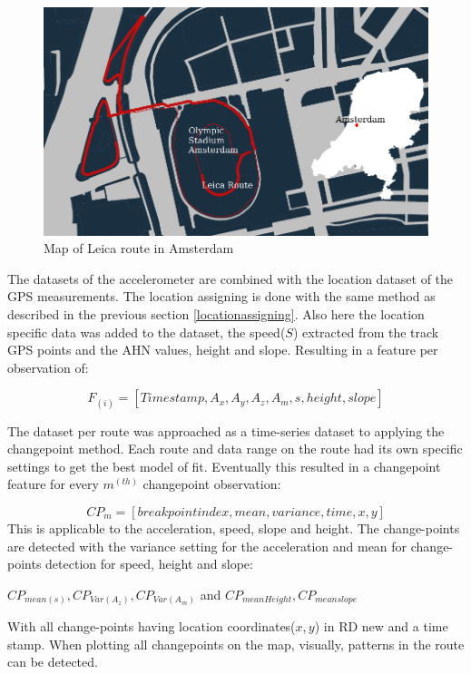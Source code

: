 \begin{figure}[hb]
\includegraphics[width=\textwidth]{img/M_overviewRouteLeica.pdf}
\centering
\caption{ Map of Leica route in Amsterdam\label{leicatracks}}
\end{figure}

The datasets of the accelerometer are combined with the location dataset of the GPS measurements. The location assigning is done with the same method as described in the previous section \ref{locationassigning}. Also here the location specific data was added to the dataset, the speed($S$) extracted from the track GPS points and the AHN values, height and slope. Resulting in a feature per observation of:

\begin{equation} 
	F_(i) = [ Time stamp, A_{x}, A_{y}, A_{z}, A_{m}, s, height, slope] 
\end{equation}

The dataset per route was approached as a time-series dataset to applying the changepoint method. Each route and data range on the route had its own specific settings to get the best model of fit. Eventually this resulted in a changepoint feature for every $m^(th)$ changepoint observation:

\begin{equation}
CP_m = [ breakpoint index, mean, variance, time, x,y]
\end{equation}
This is applicable to the acceleration, speed, slope and height. The change-points are detected with the variance setting for the acceleration and mean for change-points detection for speed, height and slope: 

$CP_{mean(s)}, CP_{Var(A_{z})}, CP_{Var(A_{m})}$ and $CP_{mean Height}, CP_{mean slope}$ 

With all change-points having location coordinates($x,y$) in RD new and a time stamp. When plotting all changepoints on the map, visually, patterns in the route can be detected.

